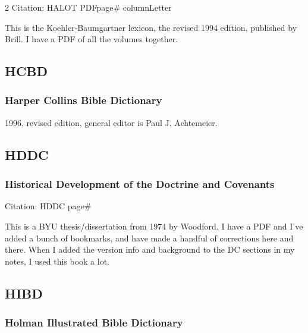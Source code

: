 \begin{multicols}{2}
			Citation:
				HALOT PDFpage\# columnLetter
		
			This is the Koehler-Baumgartner lexicon, the revised 1994 edition, published by Brill. I have a PDF of all the volumes together.
			
	\subsection*{HCBD}
	
		\subsubsection*{Harper Collins Bible Dictionary}
		
			1996, revised edition, general editor is Paul J. Achtemeier.
		
	\subsection*{HDDC}
	
		\subsubsection*{Historical Development of the Doctrine and Covenants}
		
			Citation:
				HDDC page\#
		
			This is a BYU thesis/dissertation from 1974 by Woodford. I have a PDF and I've added a bunch of bookmarks, and have made a handful of corrections here and there. When I added the version info and background to the DC sections in my notes, I used this book a lot.
			
	\subsection*{HIBD}
	
		\subsubsection*{Holman Illustrated Bible Dictionary}
		

\end{multicols}
